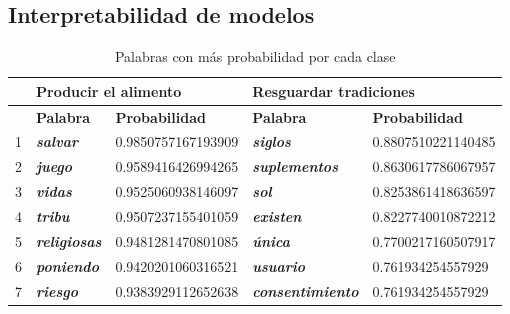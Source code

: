 \documentclass[
	spanish, %
	letterpaper, oneside
]{article}
\begin{document}


\subsection{Interpretabilidad de modelos}

\begin{table}[htbp]
\centering
\caption{Palabras con más probabilidad por cada clase}
\begin{tabular}{l|ll|ll|}
\cline{2-5}
                                & \multicolumn{2}{l|}{\textbf{Producir el alimento}}                        & \multicolumn{2}{l|}{\textbf{Resguardar tradiciones}}                          \\ \hline
\multicolumn{1}{|l|}{\textbf{}} & \multicolumn{1}{l|}{\textbf{Palabra}}             & \textbf{Probabilidad} & \multicolumn{1}{l|}{\textbf{Palabra}}                 & \textbf{Probabilidad} \\ \hline
\multicolumn{1}{|l|}{1}         & \multicolumn{1}{l|}{\textit{\textbf{salvar}}}     & 0.9850757167193909    & \multicolumn{1}{l|}{\textit{\textbf{siglos}}}         & 0.8807510221140485    \\ \hline
\multicolumn{1}{|l|}{2}         & \multicolumn{1}{l|}{\textit{\textbf{juego}}}      & 0.9589416426994265    & \multicolumn{1}{l|}{\textit{\textbf{suplementos}}}    & 0.8630617786067957    \\ \hline
\multicolumn{1}{|l|}{3}         & \multicolumn{1}{l|}{\textit{\textbf{vidas}}}      & 0.9525060938146097    & \multicolumn{1}{l|}{\textit{\textbf{sol}}}            & 0.8253861418636597    \\ \hline
\multicolumn{1}{|l|}{4}         & \multicolumn{1}{l|}{\textit{\textbf{tribu}}}      & 0.9507237155401059    & \multicolumn{1}{l|}{\textit{\textbf{existen}}}        & 0.8227740010872212    \\ \hline
\multicolumn{1}{|l|}{5}         & \multicolumn{1}{l|}{\textit{\textbf{religiosas}}} & 0.9481281470801085    & \multicolumn{1}{l|}{\textit{\textbf{única}}}          & 0.7700217160507917    \\ \hline
\multicolumn{1}{|l|}{6}         & \multicolumn{1}{l|}{\textit{\textbf{poniendo}}}   & 0.9420201060316521    & \multicolumn{1}{l|}{\textit{\textbf{usuario}}}        & 0.761934254557929     \\ \hline
\multicolumn{1}{|l|}{7}         & \multicolumn{1}{l|}{\textit{\textbf{riesgo}}}     & 0.9383929112652638    & \multicolumn{1}{l|}{\textit{\textbf{consentimiento}}} & 0.761934254557929     \\ \hline

\end{tabular}
\end{table}
\end{document}

